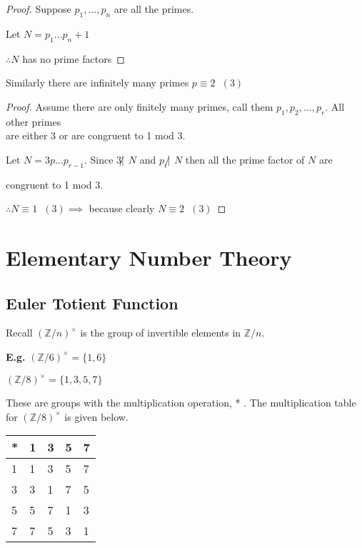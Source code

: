 \documentclass[11pt]{article}
\begin{document}
\begin{proof}
Suppose $p_1, \dots, p_n$ are all the primes.

	\hspace{18pt}Let $N = p_1\dots p_n + 1$

	\hspace{18pt}$\therefore N$ has no prime factors \lightning 
\end{proof}
\flushleft{}
Similarly there are infinitely many primes $p \equiv 2 \hspace{7pt} (3)$
\begin{proof}
Assume there are only finitely many primes, call them $p_1,p_2,\dots,p_r$. All other primes\\ 
	\hspace{31pt}	are either 3 or are congruent to 1 mod 3.
	
	\hspace{35pt}Let $N=3p\dots p_{r-1}$. Since $3 \not | \hspace{5pt}N$ and $p_i \not |\hspace{5pt} N $ then all the prime factor of $N$ are 
	
	\hspace{35pt}congruent to 1 mod 3.


	\hspace{35pt}$\therefore N \equiv 1\hspace{7pt} (3) \implies$ because clearly $N \equiv 2\hspace{7pt} (3)$ 
\end{proof}


\newpage
\section{Elementary Number Theory}

\subsection{Euler Totient Function}
Recall $(\mathbb{Z}/n)^\times$ is the group of invertible elements in $\mathbb{Z}/n$.

\textbf{E.g.} $(\mathbb{Z}/6)^\times = \{ 1,6\} $

\hspace{23pt} $(\mathbb{Z}/8)^\times = \{1,3,5,7\}$

These are groups with the multiplication operation, * . The multiplication table for $(\mathbb{Z}/8)^\times$ is given below. 

\centering
	\begin{tabular}{l|llll}
		* & \multicolumn{1}{l}{1} 
		 & \multicolumn{1}{l}{3} 
		 & \multicolumn{1}{l}{5} 
		 & \multicolumn{1}{l}{7} \\ \hline
		1 & 1 & 3 & 5 & 7 \\
		3 & 3 & 1 & 7 & 5 \\
		5 & 5 & 7 & 1 & 3 \\ 
		7 & 7 & 5 & 3 & 1 \\ 
	\end{tabular}
\end{document}
